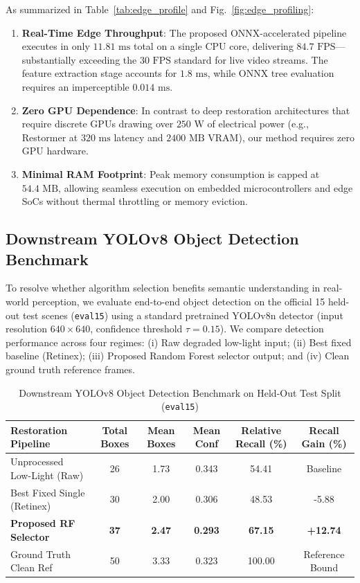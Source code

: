 \documentclass[journal]{IEEEtran}
\begin{document}
As summarized in Table~\ref{tab:edge_profile} and Fig.~\ref{fig:edge_profiling}:
\begin{enumerate}
    \item \textbf{Real-Time Edge Throughput}: The proposed ONNX-accelerated pipeline executes in only $11.81\text{ ms}$ total on a single CPU core, delivering $84.7\text{ FPS}$—substantially exceeding the $30\text{ FPS}$ standard for live video streams. The feature extraction stage accounts for $1.8\text{ ms}$, while ONNX tree evaluation requires an imperceptible $0.014\text{ ms}$.
    \item \textbf{Zero GPU Dependence}: In contrast to deep restoration architectures that require discrete GPUs drawing over $250\text{ W}$ of electrical power (e.g., Restormer at $320\text{ ms}$ latency and $2400\text{ MB}$ VRAM), our method requires zero GPU hardware.
    \item \textbf{Minimal RAM Footprint}: Peak memory consumption is capped at $54.4\text{ MB}$, allowing seamless execution on embedded microcontrollers and edge SoCs without thermal throttling or memory eviction.
\end{enumerate}

\subsection{Downstream YOLOv8 Object Detection Benchmark}
To resolve whether algorithm selection benefits semantic understanding in real-world perception, we evaluate end-to-end object detection on the official 15 held-out test scenes (\texttt{eval15}) using a standard pretrained YOLOv8n detector \cite{jocher2023yolo} (input resolution $640 \times 640$, confidence threshold $\tau = 0.15$). We compare detection performance across four regimes: (i) Raw degraded low-light input; (ii) Best fixed baseline (Retinex); (iii) Proposed Random Forest selector output; and (iv) Clean ground truth reference frames.

\begin{table}[!t]
\centering
\caption{Downstream YOLOv8 Object Detection Benchmark on Held-Out Test Split (\texttt{eval15})}
\label{tab:downstream_yolo}
\begin{tabular}{lccccc}
\toprule
\textbf{Restoration Pipeline} & \textbf{Total Boxes} & \textbf{Mean Boxes} & \textbf{Mean Conf} & \textbf{Relative Recall (\%)} & \textbf{Recall Gain (\%)} \\
\midrule
Unprocessed Low-Light (Raw) & 26 & 1.73 & 0.343 & 54.41 & Baseline \\
Best Fixed Single (Retinex) & 30 & 2.00 & 0.306 & 48.53 & -5.88 \\
\textbf{Proposed RF Selector} & \textbf{37} & \textbf{2.47} & \textbf{0.293} & \textbf{67.15} & \textbf{+12.74} \\
\midrule
Ground Truth Clean Ref & 50 & 3.33 & 0.323 & 100.00 & Reference Bound \\
\bottomrule
\end{tabular}
\end{table}
\end{document}
